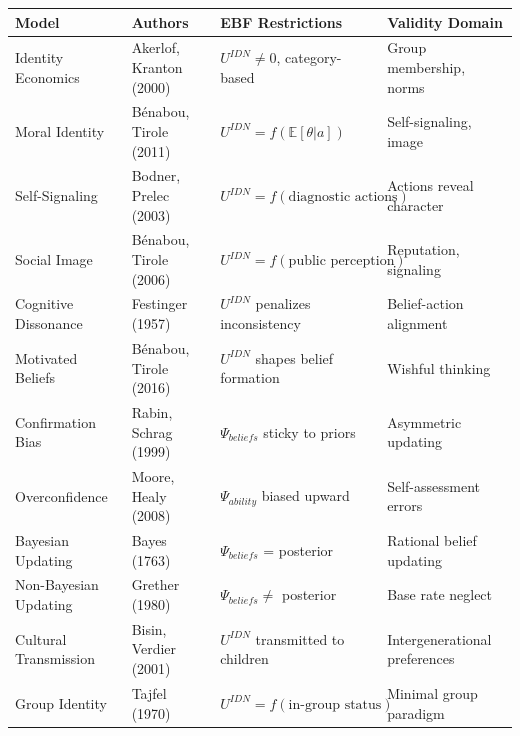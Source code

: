 \small
\begin{longtable}{@{}p{3cm}p{2.5cm}p{4cm}p{4cm}@{}}
\toprule
\textbf{Model} & \textbf{Authors} & \textbf{EBF Restrictions} & \textbf{Validity Domain} \\
\midrule
\endhead

Identity Economics & Akerlof, Kranton (2000) &
$U^{IDN} \neq 0$, category-based &
Group membership, norms \\

Moral Identity & Bénabou, Tirole (2011) &
$U^{IDN} = f(\mathbb{E}[\theta|a])$ &
Self-signaling, image \\

Self-Signaling & Bodner, Prelec (2003) &
$U^{IDN} = f(\text{diagnostic actions})$ &
Actions reveal character \\

Social Image & Bénabou, Tirole (2006) &
$U^{IDN} = f(\text{public perception})$ &
Reputation, signaling \\

Cognitive Dissonance & Festinger (1957) &
$U^{IDN}$ penalizes inconsistency &
Belief-action alignment \\

Motivated Beliefs & Bénabou, Tirole (2016) &
$U^{IDN}$ shapes belief formation &
Wishful thinking \\

Confirmation Bias & Rabin, Schrag (1999) &
$\Psi_{beliefs}$ sticky to priors &
Asymmetric updating \\

Overconfidence & Moore, Healy (2008) &
$\Psi_{ability}$ biased upward &
Self-assessment errors \\

Bayesian Updating & Bayes (1763) &
$\Psi_{beliefs}$ = posterior &
Rational belief updating \\

Non-Bayesian Updating & Grether (1980) &
$\Psi_{beliefs} \neq$ posterior &
Base rate neglect \\

Cultural Transmission & Bisin, Verdier (2001) &
$U^{IDN}$ transmitted to children &
Intergenerational preferences \\

Group Identity & Tajfel (1970) &
$U^{IDN} = f(\text{in-group status})$ &
Minimal group paradigm \\

\bottomrule
\end{longtable}
\normalsize

